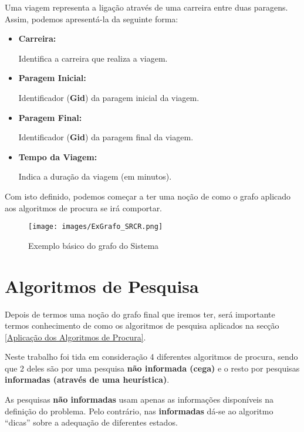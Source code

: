 \documentclass[a4paper,12pt]{report}
\begin{document}
Uma viagem representa a ligação através de uma carreira entre duas paragens. Assim, podemos apresentá-la da seguinte forma:

\begin{itemize}
    \item \textbf{Carreira:}
    \par Identifica a carreira que realiza a viagem.
    \item \textbf{Paragem Inicial:}
    \par Identificador (\textbf{Gid}) da paragem inicial da viagem.
    \item \textbf{Paragem Final:}
    \par Identificador (\textbf{Gid}) da paragem final da viagem.
    \item \textbf{Tempo da Viagem:}
    \par Indica a duração da viagem (em minutos).
\end{itemize}

Com isto definido, podemos começar a ter uma noção de como o grafo aplicado aos algoritmos de procura se irá comportar.

\begin{figure}[H]
    \centering
    \texttt{[image: images/ExGrafo\_SRCR.png]}
    \caption{Exemplo básico do grafo do Sistema}
    \label{fig:ExGrafo_SRCR}
\end{figure}


\section{Algoritmos de Pesquisa}
\label{Algoritmos de Pesquisa}

\par Depois de termos uma noção do grafo final que iremos ter, será importante termos conhecimento de como os algoritmos de pesquisa aplicados na secção \ref{Aplicação dos Algoritmos de Procura}.
\par Neste trabalho foi tida em consideração 4 diferentes algoritmos de procura, sendo que 2 deles são por uma pesquisa \textbf{não informada (cega)} e o resto por pesquisas \textbf{informadas (através de uma heurística)}.
\par As pesquisas \textbf{não informadas} usam apenas as informações disponíveis na definição do problema. Pelo contrário, nas \textbf{informadas} dá-se ao algoritmo “dicas” sobre a adequação de diferentes estados.

\vspace{1cm}
\end{document}
